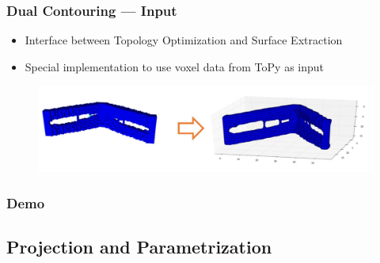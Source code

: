 \begin{frame}

	\frametitle{Dual Contouring --- Input}
	
	\begin{overlayarea}{\textwidth}{.25 \textheight}
	\begin{itemize}
	\item Interface between Topology Optimization and Surface Extraction
	\item Special implementation to use voxel data from ToPy as input
	\end{itemize}
	\end{overlayarea}

	\begin{overlayarea}{\textwidth}{.75 \textheight}
	\begin{figure}
	\includegraphics[scale=0.35]{Pictures/DC/cantilever.pdf}
	\end{figure}
	\end{overlayarea}
	
\end{frame}

\begin{frame}

	\frametitle{Demo}
	

\end{frame}

\subsection{Projection and Parametrization}

